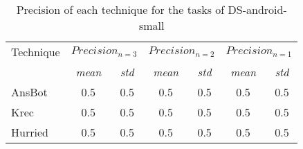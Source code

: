 \begin{table}[H]
\centering    
\begin{scriptsize}
\begin{threeparttable}
\begin{tabular}{lcccccc}

\hline


\multirow{2.5}{*}{Technique}
& \multicolumn{2}{c}{\textit{$Precision_{n=3}$}}
& \multicolumn{2}{c}{\textit{$Precision_{n=2}$}}
& \multicolumn{2}{c}{\textit{$Precision_{n=1}$}}
\\ \cmidrule(l){2-3} \cmidrule(l){4-5} \cmidrule(l){6-7} 


& \textit{mean}
& \textit{std}
& \textit{mean}
& \textit{std}
& \textit{mean}
& \textit{std}
\\


\hline
\hline

\acs{AnsBot} 
& 0.5 & 0.5 %
& 0.5 & 0.5 %
& 0.5 & 0.5 %
\\

\acs{Krec} 
& 0.5 & 0.5 %
& 0.5 & 0.5 %
& 0.5 & 0.5 %
\\

\acs{Hurried} 
& 0.5 & 0.5 %
& 0.5 & 0.5 %
& 0.5 & 0.5 %
\\

\hline

\end{tabular}
\end{threeparttable}
\end{scriptsize}
\caption{Precision of each technique for the tasks of \acs{DS-android-small}}
\label{tbl:ds-small-results-precision}
\end{table}

    









